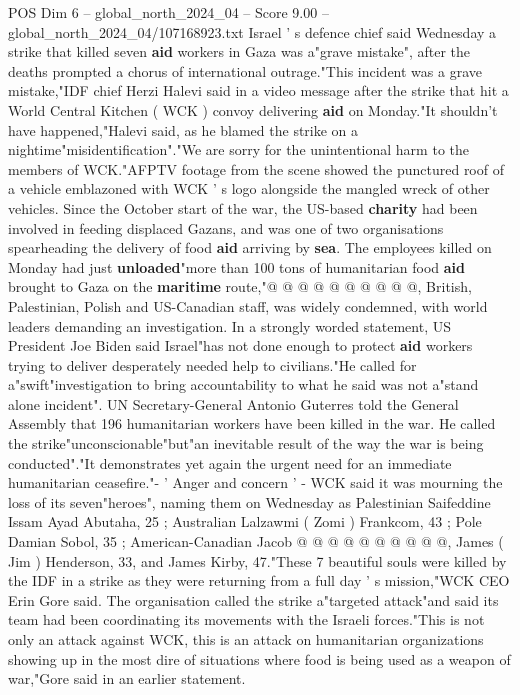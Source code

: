 \begin{textsample}{POS Dim 6 – global\_north\_2024\_04 – Score 9.00 – global\_north\_2024\_04/107168923.txt}  \label{ex:f6_pos_078}
Israel ' s defence chief said Wednesday a strike that killed seven \textbf{aid} workers in Gaza was a"grave mistake", after the deaths prompted a chorus of international outrage."This incident was a grave mistake,"IDF chief Herzi Halevi said in a video message after the strike that hit a World Central Kitchen ( WCK ) convoy delivering \textbf{aid} on Monday."It shouldn't have happened,"Halevi said, as he blamed the strike on a nightime"misidentification"."We are sorry for the unintentional harm to the members of WCK."AFPTV footage from the scene showed the punctured roof of a vehicle emblazoned with WCK ' s logo alongside the mangled wreck of other vehicles.
Since the October start of the war, the US-based \textbf{charity} had been involved in feeding displaced Gazans, and was one of two organisations spearheading the delivery of food \textbf{aid} arriving by \textbf{sea}.
The employees killed on Monday had just \textbf{unloaded}"more than 100 tons of humanitarian food \textbf{aid} brought to Gaza on the \textbf{maritime} route,"@ @ @ @ @ @ @ @ @ @, British, Palestinian, Polish and US-Canadian staff, was widely condemned, with world leaders demanding an investigation.
In a strongly worded statement, US President Joe Biden said Israel"has not done enough to protect \textbf{aid} workers trying to deliver desperately needed help to civilians."He called for a"swift"investigation to bring accountability to what he said was not a"stand alone incident".
UN Secretary-General Antonio Guterres told the General Assembly that 196 humanitarian workers have been killed in the war.
He called the strike"unconscionable"but"an inevitable result of the way the war is being conducted"."It demonstrates yet again the urgent need for an immediate humanitarian ceasefire."- ' Anger and concern ' - WCK said it was mourning the loss of its seven"heroes", naming them on Wednesday as Palestinian Saifeddine Issam Ayad Abutaha, 25 ; Australian Lalzawmi ( Zomi ) Frankcom, 43 ; Pole Damian Sobol, 35 ; American-Canadian Jacob @ @ @ @ @ @ @ @ @ @, James ( Jim ) Henderson, 33, and James Kirby, 47."These 7 beautiful souls were killed by the IDF in a strike as they were returning from a full day ' s mission,"WCK CEO Erin Gore said.
The organisation called the strike a"targeted attack"and said its team had been coordinating its movements with the Israeli forces."This is not only an attack against WCK, this is an attack on humanitarian organizations showing up in the most dire of situations where food is being used as a weapon of war,"Gore said in an earlier statement.

\end{textsample}
